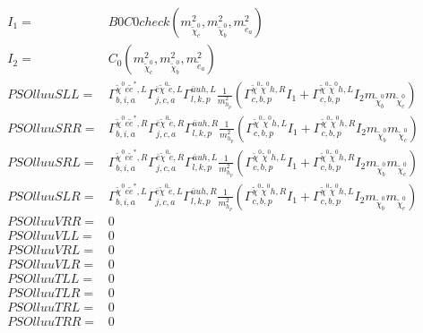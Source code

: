 \documentclass[A4,landscape]{article}
\begin{document}
\begin{align} 
I_1= & B0C0check(m^2_{\tilde{\chi}^0_{{c}}}, m^2_{\tilde{\chi}^0_{{b}}}, m^2_{\tilde{e}_{{a}}}) \\ 
I_2= & C_0(m^2_{\tilde{\chi}^0_{{c}}}, m^2_{\tilde{\chi}^0_{{b}}}, m^2_{\tilde{e}_{{a}}}) \\ 
  PSOlluuSLL= &  \Gamma^{\tilde{\chi}^0 e \tilde{e}^*,L}_{b, i, a} \Gamma^{\bar{e}\tilde{\chi}^0 \tilde{e} ,L}_{j, c, a} \Gamma^{\bar{u}u h ,L}_{l, k, p} \frac{1}{m^2_{h_{{p}}}} (\Gamma^{\tilde{\chi}^0 \tilde{\chi}^0 h ,R}_{c, b, p} I_1 + \Gamma^{\tilde{\chi}^0 \tilde{\chi}^0 h ,L}_{c, b, p} I_2 m_{\tilde{\chi}^0_{{b}}} m_{\tilde{\chi}^0_{{c}}}) \\ 
  PSOlluuSRR= &  \Gamma^{\tilde{\chi}^0 e \tilde{e}^*,R}_{b, i, a} \Gamma^{\bar{e}\tilde{\chi}^0 \tilde{e} ,R}_{j, c, a} \Gamma^{\bar{u}u h ,R}_{l, k, p} \frac{1}{m^2_{h_{{p}}}} (\Gamma^{\tilde{\chi}^0 \tilde{\chi}^0 h ,L}_{c, b, p} I_1 + \Gamma^{\tilde{\chi}^0 \tilde{\chi}^0 h ,R}_{c, b, p} I_2 m_{\tilde{\chi}^0_{{b}}} m_{\tilde{\chi}^0_{{c}}}) \\ 
  PSOlluuSRL= &  \Gamma^{\tilde{\chi}^0 e \tilde{e}^*,R}_{b, i, a} \Gamma^{\bar{e}\tilde{\chi}^0 \tilde{e} ,R}_{j, c, a} \Gamma^{\bar{u}u h ,L}_{l, k, p} \frac{1}{m^2_{h_{{p}}}} (\Gamma^{\tilde{\chi}^0 \tilde{\chi}^0 h ,L}_{c, b, p} I_1 + \Gamma^{\tilde{\chi}^0 \tilde{\chi}^0 h ,R}_{c, b, p} I_2 m_{\tilde{\chi}^0_{{b}}} m_{\tilde{\chi}^0_{{c}}}) \\ 
  PSOlluuSLR= &  \Gamma^{\tilde{\chi}^0 e \tilde{e}^*,L}_{b, i, a} \Gamma^{\bar{e}\tilde{\chi}^0 \tilde{e} ,L}_{j, c, a} \Gamma^{\bar{u}u h ,R}_{l, k, p} \frac{1}{m^2_{h_{{p}}}} (\Gamma^{\tilde{\chi}^0 \tilde{\chi}^0 h ,R}_{c, b, p} I_1 + \Gamma^{\tilde{\chi}^0 \tilde{\chi}^0 h ,L}_{c, b, p} I_2 m_{\tilde{\chi}^0_{{b}}} m_{\tilde{\chi}^0_{{c}}}) \\ 
  PSOlluuVRR= & 0 \\ 
  PSOlluuVLL= & 0 \\ 
  PSOlluuVRL= & 0 \\ 
  PSOlluuVLR= & 0 \\ 
  PSOlluuTLL= & 0 \\ 
  PSOlluuTLR= & 0 \\ 
  PSOlluuTRL= & 0 \\ 
  PSOlluuTRR= & 0 \\ 
\end{align} 
\end{document}
